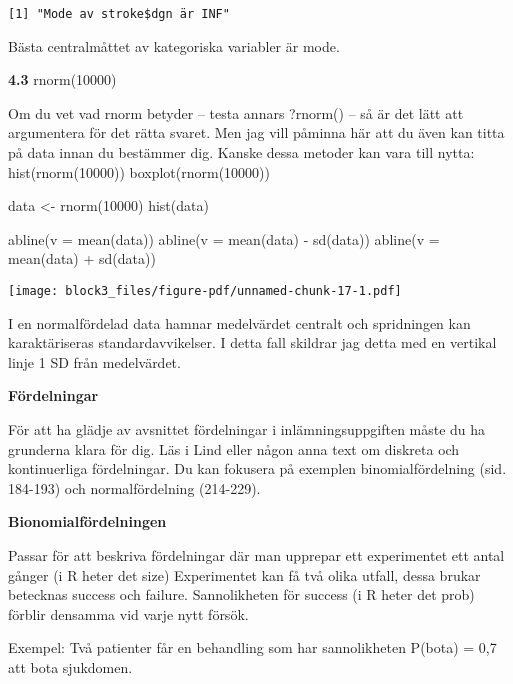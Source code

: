 \documentclass[
  letterpaper,
  DIV=11,
  numbers=noendperiod]{scrartcl}
\newenvironment{Shaded}{\begin{snugshade}}{\end{snugshade}}
\newcommand{\AttributeTok}[1]{\textcolor[rgb]{0.40,0.45,0.13}{#1}}
\newcommand{\DecValTok}[1]{\textcolor[rgb]{0.68,0.00,0.00}{#1}}
\newcommand{\FunctionTok}[1]{\textcolor[rgb]{0.28,0.35,0.67}{#1}}
\newcommand{\NormalTok}[1]{\textcolor[rgb]{0.00,0.23,0.31}{#1}}
\newcommand{\OtherTok}[1]{\textcolor[rgb]{0.00,0.23,0.31}{#1}}
\newcommand{\SpecialCharTok}[1]{\textcolor[rgb]{0.37,0.37,0.37}{#1}}
\begin{document}
\begin{verbatim}
[1] "Mode av stroke$dgn är INF"
\end{verbatim}

Bästa centralmåttet av kategoriska variabler är mode.

\textbf{4.3} rnorm(10000)

Om du vet vad rnorm betyder -- testa annars ?rnorm() -- så är det lätt
att argumentera för det rätta svaret. Men jag vill påminna här att du
även kan titta på data innan du bestämmer dig. Kanske dessa metoder kan
vara till nytta: hist(rnorm(10000)) boxplot(rnorm(10000))

\begin{Shaded}
\begin{Highlighting}[]
\NormalTok{data }\OtherTok{\textless{}{-}} \FunctionTok{rnorm}\NormalTok{(}\DecValTok{10000}\NormalTok{)}
\FunctionTok{hist}\NormalTok{(data)}

\FunctionTok{abline}\NormalTok{(}\AttributeTok{v =} \FunctionTok{mean}\NormalTok{(data))}
\FunctionTok{abline}\NormalTok{(}\AttributeTok{v =} \FunctionTok{mean}\NormalTok{(data) }\SpecialCharTok{{-}} \FunctionTok{sd}\NormalTok{(data))}
\FunctionTok{abline}\NormalTok{(}\AttributeTok{v =} \FunctionTok{mean}\NormalTok{(data) }\SpecialCharTok{+} \FunctionTok{sd}\NormalTok{(data))}
\end{Highlighting}
\end{Shaded}

\texttt{[image: block3\_files/figure-pdf/unnamed-chunk-17-1.pdf]}

I en normalfördelad data hamnar medelvärdet centralt och spridningen kan
karaktäriseras standardavvikelser. I detta fall skildrar jag detta med
en vertikal linje 1 SD från medelvärdet.

\textbf{Fördelningar}

För att ha glädje av avsnittet fördelningar i inlämningsuppgiften måste
du ha grunderna klara för dig. Läs i Lind eller någon anna text om
diskreta och kontinuerliga fördelningar. Du kan fokusera på exemplen
binomialfördelning (sid. 184-193) och normalfördelning (214-229).

\textbf{Bionomialfördelningen}

Passar för att beskriva fördelningar där man upprepar ett experimentet
ett antal gånger (i R heter det size) Experimentet kan få två olika
utfall, dessa brukar betecknas success och failure. Sannolikheten för
success (i R heter det prob) förblir densamma vid varje nytt försök.

Exempel: Två patienter får en behandling som har sannolikheten P(bota) =
0,7 att bota sjukdomen.
\end{document}
